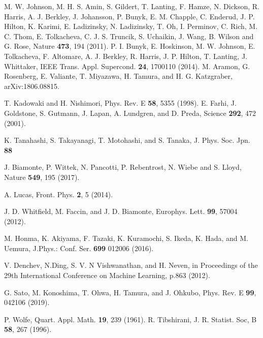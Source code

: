 \documentclass[fp,twocolumn]{jpsj3}
\begin{document}

\begin{thebibliography}{1}
  M. W. Johnson, M. H. S. Amin, S. Gildert, T. Lanting, F. Hamze, N. Dickson, R. Harris, A. J. Berkley, J. Johansson, P. Bunyk, E. M. Chapple, C. Enderud, J. P. Hilton, K. Karimi, E. Ladizinsky, N. Ladizinsky, T. Oh, I. Perminov, C. Rich, M. C. Thom, E. Tolkacheva, C. J. S. Truncik, S. Uchaikin, J. Wang, B. Wilson and G. Rose, Nature {\bf 473}, 194 (2011).
  P. I. Bunyk, E. Hoskinson, M. W. Johnson, E. Tolkacheva, F. Altomare, A. J. Berkley, R. Harris, J. P. Hilton, T. Lanting, J. Whittaker, IEEE Trans. Appl. Supercond. {\bf 24}, 1700110 (2014).
  M. Aramon, G. Rosenberg, E. Valiante, T. Miyazawa, H. Tamura, and H. G. Katzgraber, arXiv:1806.08815.

T. Kadowaki and H. Nishimori, Phys. Rev. E {\bf 58}, 5355 (1998).
E. Farhi, J. Goldstone, S. Gutmann, J. Lapan, A. Lundgren, and D. Preda, Science {\bf 292}, 472 (2001).

K. Tanahashi, S. Takayanagi, T. Motohashi, and S. Tanaka, J. Phys. Soc. Jpn. {\bf 88}

J. Biamonte, P. Wittek, N. Pancotti, P. Rebentrost, N. Wiebe and S. Lloyd, Nature {\bf 549}, 195 (2017).

A. Lucas, Front. Phys. {\bf 2}, 5 (2014).


J. D. Whitfield, M. Faccin, and J. D. Biamonte, Europhys. Lett. {\bf 99}, 57004 (2012).


  M. Honma, K. Akiyama, F. Tazaki, K. Kuramochi, S. Ikeda, K. Hada, and M. Uemura, J.Phys.: Conf. Ser. {\bf 699} 012006 (2016).

  V. Denchev, N.Ding, S. V. N Vishwanathan, and H. Neven, in Proceedings of the 29th International Conference on Machine Learning, p.863 (2012).

  G. Sato, M. Konoshima, T. Ohwa, H. Tamura, and J. Ohkubo, Phys. Rev. E {\bf 99}, 042106 (2019).

  P. Wolfe, Quart. Appl. Math. {\bf 19}, 239 (1961).
  R. Tibshirani, J. R. Statist. Soc, B {\bf 58}, 267 (1996).
  
\end{thebibliography}
\end{document}
